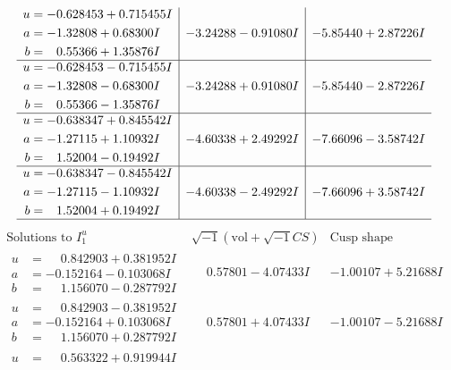 \documentclass[1p]{elsarticle_modified}
\theoremstyle{definition}
\newcommand{\I}{\sqrt{-1}}
\begin{document}
$$\begin{array}{c|c|c}
\begin{aligned}
u &= -0.628453 + 0.715455 I \\
a &= -1.32808 + 0.68300 I \\
b &= \phantom{-}0.55366 + 1.35876 I\end{aligned}
 & -3.24288 - 0.91080 I & -5.85440 + 2.87226 I \\ \hline\begin{aligned}
u &= -0.628453 - 0.715455 I \\
a &= -1.32808 - 0.68300 I \\
b &= \phantom{-}0.55366 - 1.35876 I\end{aligned}
 & -3.24288 + 0.91080 I & -5.85440 - 2.87226 I \\ \hline\begin{aligned}
u &= -0.638347 + 0.845542 I \\
a &= -1.27115 + 1.10932 I \\
b &= \phantom{-}1.52004 - 0.19492 I\end{aligned}
 & -4.60338 + 2.49292 I & -7.66096 - 3.58742 I \\ \hline\begin{aligned}
u &= -0.638347 - 0.845542 I \\
a &= -1.27115 - 1.10932 I \\
b &= \phantom{-}1.52004 + 0.19492 I\end{aligned}
 & -4.60338 - 2.49292 I & -7.66096 + 3.58742 I\\
 \hline 
 \end{array}$$\newpage$$\begin{array}{c|c|c}  
\text{Solutions to }I^u_{1}& \I (\text{vol} + \sqrt{-1}CS) & \text{Cusp shape}\\
 \hline 
\begin{aligned}
u &= \phantom{-}0.842903 + 0.381952 I \\
a &= -0.152164 - 0.103068 I \\
b &= \phantom{-}1.156070 - 0.287792 I\end{aligned}
 & \phantom{-}0.57801 - 4.07433 I & -1.00107 + 5.21688 I \\ \hline\begin{aligned}
u &= \phantom{-}0.842903 - 0.381952 I \\
a &= -0.152164 + 0.103068 I \\
b &= \phantom{-}1.156070 + 0.287792 I\end{aligned}
 & \phantom{-}0.57801 + 4.07433 I & -1.00107 - 5.21688 I \\ \hline\begin{aligned}
u &= \phantom{-}0.563322 + 0.919944 I \\

\end{aligned}
\end{array}$$
\end{document}
